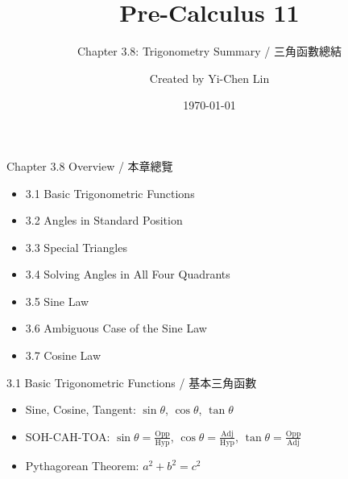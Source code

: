 \documentclass[aspectratio=169]{beamer}
\title{Pre-Calculus 11}
\subtitle{Chapter 3.8: Trigonometry Summary / 三角函數總結}
\author{Created by Yi-Chen Lin}
\date{\today}
\begin{document}
\begin{frame}
    \titlepage
\end{frame}

\begin{frame}{Chapter 3.8 Overview / 本章總覽}
    \begin{tcolorbox}[colback=lightgray,colframe=primary,title=Topics Covered]
        \footnotesize
        \begin{itemize}
            \item 3.1 Basic Trigonometric Functions
            \item 3.2 Angles in Standard Position
            \item 3.3 Special Triangles
            \item 3.4 Solving Angles in All Four Quadrants
            \item 3.5 Sine Law
            \item 3.6 Ambiguous Case of the Sine Law
            \item 3.7 Cosine Law
        \end{itemize}
    \end{tcolorbox}
\end{frame}

\begin{frame}{3.1 Basic Trigonometric Functions / 基本三角函數}
    \begin{tcolorbox}[colback=lightgray,colframe=primary,title=Key Points]
        \footnotesize
        \begin{itemize}
            \item Sine, Cosine, Tangent: $\sin\theta$, $\cos\theta$, $\tan\theta$
            \item SOH-CAH-TOA: $\sin\theta = \frac{\text{Opp}}{\text{Hyp}}$, $\cos\theta = \frac{\text{Adj}}{\text{Hyp}}$, $\tan\theta = \frac{\text{Opp}}{\text{Adj}}$
            \item Pythagorean Theorem: $a^2 + b^2 = c^2$
        \end{itemize}
    \end{tcolorbox}
    \vspace{0.5em}
    \begin{center}
    \end{center}
\end{frame}
\end{document}
